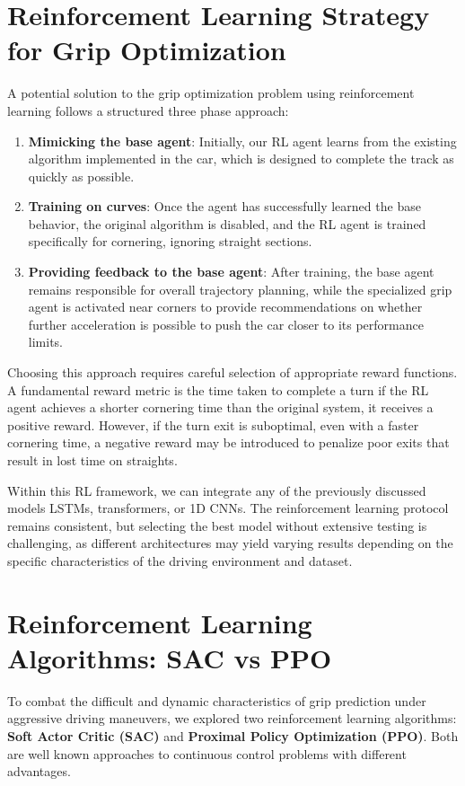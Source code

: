 \documentclass[a4paper,final,12pt]{report}
\begin{document}
\section{Reinforcement Learning Strategy for Grip Optimization}
A potential solution to the grip optimization problem using reinforcement learning follows a structured three phase approach:

\begin{enumerate}
    \item \textbf{Mimicking the base agent}: Initially, our RL agent learns from the existing algorithm implemented in the car, which is designed to complete the track as quickly as possible.
    \item \textbf{Training on curves}: Once the agent has successfully learned the base behavior, the original algorithm is disabled, and the RL agent is trained specifically for cornering, ignoring straight sections.
    \item \textbf{Providing feedback to the base agent}: After training, the base agent remains responsible for overall trajectory planning, while the specialized grip agent is activated near corners to provide recommendations on whether further acceleration is possible to push the car closer to its performance limits.
\end{enumerate}
Choosing this approach requires careful selection of appropriate reward functions. A fundamental reward metric is the time taken to complete a turn if the RL agent achieves a shorter cornering time than the original system, it receives a positive reward. However, if the turn exit is suboptimal, even with a faster cornering time, a negative reward may be introduced to penalize poor exits that result in lost time on straights.

Within this RL framework, we can integrate any of the previously discussed models LSTMs, transformers, or 1D CNNs. The reinforcement learning protocol remains consistent, but selecting the best model without extensive testing is challenging, as different architectures may yield varying results depending on the specific characteristics of the driving environment and dataset.

\section{Reinforcement Learning Algorithms: SAC vs PPO}
To combat the difficult and dynamic characteristics of grip prediction under aggressive driving maneuvers, we explored two reinforcement learning algorithms: 
\textbf{Soft Actor Critic (SAC)} and \textbf{Proximal Policy Optimization (PPO)}. Both are well known approaches to continuous control problems with different advantages.
\end{document}
